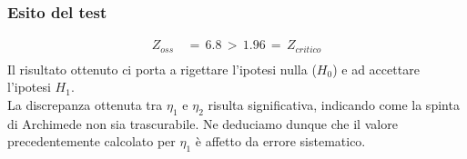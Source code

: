 \documentclass{article}
\begin{document}
\subsubsection{Esito del test}
\begin{equation*}
\begin{split}
    Z_{oss} \,&= \,6.8 \,> \,1.96 \,= \,Z_{critico} \\[0.3cm]
\end{split}
\end{equation*}
Il risultato ottenuto ci porta a rigettare l'ipotesi nulla ($H_0$) e ad accettare l'ipotesi $H_1$. 
\\La discrepanza ottenuta tra $\eta_1$ e $\eta_2$ risulta significativa, indicando come la spinta di Archimede non sia trascurabile. Ne deduciamo dunque che il valore precedentemente calcolato per $\eta_1$ è affetto da errore sistematico.
\end{document}
